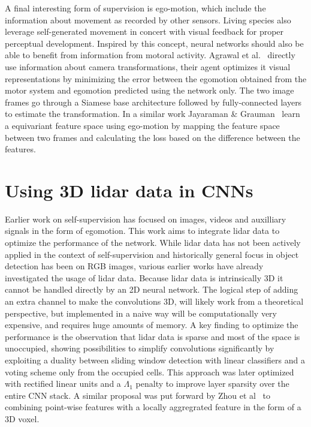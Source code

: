 A final interesting form of supervision is ego-motion, which include the information about movement as recorded by other sensors. Living species also leverage self-generated movement in concert with visual feedback for proper perceptual development. Inspired by this concept, neural networks should also be able to benefit from information from motoral activity. Agrawal et al.~\cite{agrawal2015} directly use information about camera transformations, their agent optimizes it visual representations by minimizing the error between the egomotion obtained from the motor system and egomotion predicted using the network only. The two image frames go through a Siamese base architecture followed by fully-connected layers to estimate the transformation. In a similar work Jayaraman \& Grauman~\cite{jayaraman2015} learn a equivariant feature space using ego-motion by mapping the feature space between two frames and calculating the loss based on the difference between the features.

\section{Using 3D lidar data in CNNs}
Earlier work on self-supervision has focused on images, videos and auxilliary signals in the form of egomotion. This work aims to integrate lidar data to optimize the performance of the network. While lidar data has not been actively applied in the context of self-supervision and historically general focus in object detection has been on RGB images, various earlier works have already investigated the usage of lidar data. Because lidar data is intrinsically 3D it cannot be handled directly by an 2D neural network. The logical step of adding an extra channel to make the convolutions 3D, will likely work from a theoretical perspective, but implemented in a naive way will be computationally very expensive, and requires huge amounts of memory. A key finding to optimize the performance is the observation that lidar data is sparse and most of the space is unoccupied\cite{wang2015vote}, showing possibilities to simplify convolutions significantly by exploiting a duality between sliding window detection with linear classifiers and a voting scheme only from the occupied cells. This approach was later optimized with rectified linear units and a $\Lambda_1$ penalty to improve layer sparsity over the entire CNN stack\cite{engelcke2017}. A similar proposal was put forward by Zhou et al~\cite{zhou2017voxelnet} to combining point-wise features with a locally aggregrated feature in the form of a 3D voxel. 

